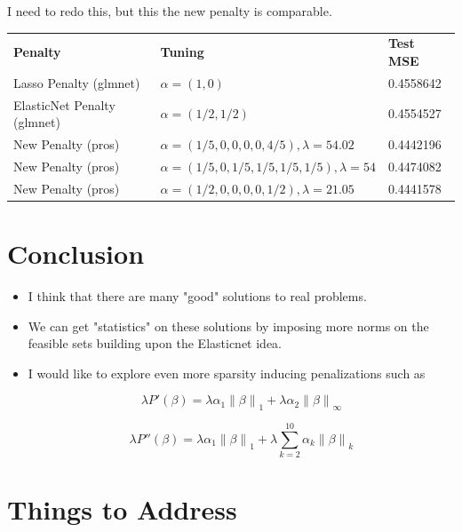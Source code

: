 \documentclass[10pt, reqno]{article}
\numberwithin{equation}{section}
\newcommand{\norm}[1]{\left\lVert#1\right\rVert}
\begin{document}
I need to redo this, but this the new penalty is comparable.

\begin{center}
\begingroup
\setlength{\tabcolsep}{6pt} %
\renewcommand{\arraystretch}{2} %
\begin{tabular}{ l l l}
\textbf{Penalty} & \textbf{Tuning} & \textbf{Test MSE} \\
Lasso Penalty (glmnet) & $\alpha = (1, 0)$ & 0.4558642 \\
ElasticNet Penalty (glmnet) & $\alpha = (1/2, 1/2)$  & 0.4554527   \\
New Penalty (pros) & $\alpha = (1/5, 0, 0, 0, 0, 4/5), \lambda = 54.02$ & 0.4442196 \\
New Penalty (pros) & $\alpha = (1/5, 0, 1/5, 1/5, 1/5, 1/5), \lambda = 54$ & 0.4474082 \\
New Penalty (pros) & $\alpha = (1/2, 0, 0, 0, 0, 1/2), \lambda = 21.05$ & 0.4441578 \\
\end{tabular}
\endgroup
\end{center}

\newpage
\section*{Conclusion}

\begin{itemize}
\item I think that there are many "good" solutions to real problems.

\item We can get "statistics" on these solutions by imposing more norms on the feasible sets building upon the Elasticnet \cite{elasticnet} idea.

\item I would like to explore even more sparsity inducing penalizations such as

\[
\lambda P'(\beta) = \lambda \alpha_1 \norm{\beta}_1 + \lambda \alpha_2 \norm{\beta}_\infty 
\]

\[
\lambda P''(\beta) = \lambda \alpha_1 \norm{\beta}_1 + \lambda \sum_{k = 2}^{10} \alpha_k \norm{\beta}_{k}
\]

\end{itemize}

\newpage
\section*{Things to Address}
\end{document}
